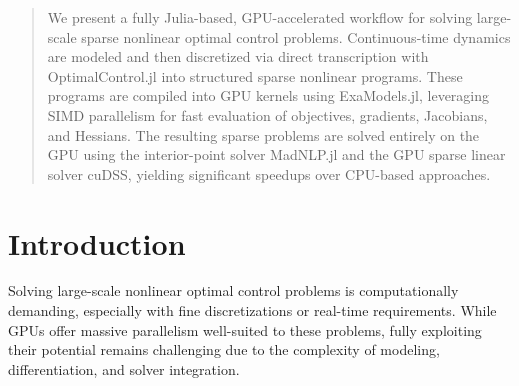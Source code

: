 \documentclass[twoside,leqno,twocolumn]{article}
\begin{document}


\begin{abstract}
    We present a fully Julia-based, GPU-accelerated workflow for solving large-scale sparse nonlinear optimal control problems.
    Continuous-time dynamics are modeled and then discretized via direct transcription with OptimalControl.jl into structured sparse nonlinear programs.
    These programs are compiled into GPU kernels using ExaModels.jl, leveraging SIMD parallelism for fast evaluation of objectives, gradients, Jacobians, and Hessians.
    The resulting sparse problems are solved entirely on the GPU using the interior-point solver MadNLP.jl and the GPU sparse linear solver cuDSS, yielding significant speedups over CPU-based approaches.
\end{abstract}




\section{Introduction}

Solving large-scale nonlinear optimal control problems is computationally demanding, especially with fine discretizations or real-time requirements.  
While GPUs offer massive parallelism well-suited to these problems, fully exploiting their potential remains challenging due to the complexity of modeling, differentiation, and solver integration.
\end{document}
